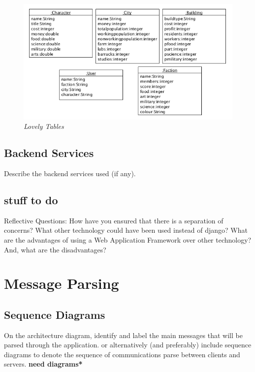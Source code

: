\documentclass{sig-alt-release2}
\begin{document}
\begin{figure}[!htbp]
  \caption{\textit{Lovely Tables}}
  \begin{center}
		\includegraphics[scale=0.40]{img/tables.png}
  \end{center}
\end{figure}

\subsection{Backend Services}

Describe the backend services used (if any).

\subsection{stuff to do} 

Reflective Questions: 
How have you ensured that there is a separation of concerns? 
What other technology could have been used instead of django? 
What are the advantages of using a Web Application Framework over other technology? 
And, what are the disadvantages?

\section{Message Parsing}

\subsection{Sequence Diagrams}

On the architecture diagram, identify and label the main messages that will be parsed through the application.
or alternatively (and preferably) include sequence diagrams to denote the sequence of communications parse between clients and servers. {\bf *need diagrams*} 
\end{document}
